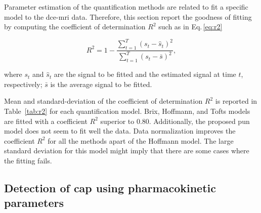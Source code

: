 Parameter estimation of the quantification methods are related to fit a specific model to the \ac{dce}-\ac{mri} data.
Therefore, this section report the goodness of fitting by computing the coefficient of determination $R^2$ such as in Eq.\,\eqref{eq:r2}

\begin{equation}
  R^2 = 1 - \frac{\sum_{t = 1}^{T} (s_t - \hat{s}_t)^2}{\sum_{t = 1}^{T} (s_t - \bar{s})^2} ,
  \label{eq:r2}
\end{equation}

\noindent where $s_t$ and $\hat{s}_t$ are the signal to be fitted and the estimated signal at time $t$, respectively; $\bar{s}$ is the average signal to be fitted.

Mean and standard-deviation of the coefficient of determination $R^{2}$ is reported in Table~\ref{tab:r2} for each quantification model.
Brix, Hoffmann, and Tofts models are fitted with a coefficient $R^{2}$ superior to 0.80.
Additionally, the proposed \ac{pun} model does not seem to fit well the data.
Data normalization improves the coefficient $R^2$ for all the methods apart of the Hoffmann model.
The large standard deviation for this model might imply that there are some cases where the fitting fails.

\subsection{Detection of \acs*{cap} using pharmacokinetic parameters}

